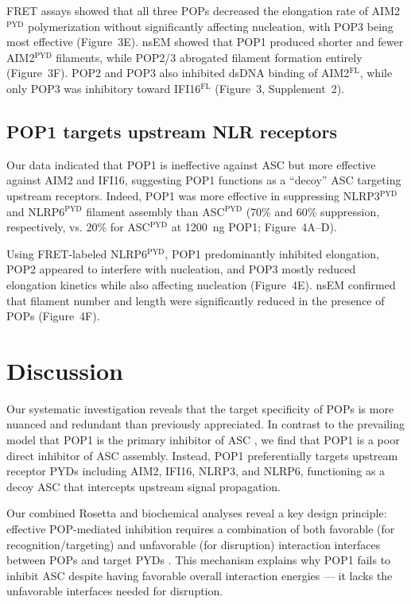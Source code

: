 \documentclass[11pt]{article}
\begin{document}
FRET assays showed that all three POPs decreased the elongation rate of AIM2$^{\text{PYD}}$ polymerization without significantly affecting nucleation, with POP3 being most effective (Figure~3E). nsEM showed that POP1 produced shorter and fewer AIM2$^{\text{PYD}}$ filaments, while POP2/3 abrogated filament formation entirely (Figure~3F). POP2 and POP3 also inhibited dsDNA binding of AIM2$^{\text{FL}}$, while only POP3 was inhibitory toward IFI16$^{\text{FL}}$ (Figure~3, Supplement~2).

\subsection{POP1 targets upstream NLR receptors}

Our data indicated that POP1 is ineffective against ASC but more effective against AIM2 and IFI16, suggesting POP1 functions as a ``decoy'' ASC targeting upstream receptors. Indeed, POP1 was more effective in suppressing NLRP3$^{\text{PYD}}$ and NLRP6$^{\text{PYD}}$ filament assembly than ASC$^{\text{PYD}}$ (70\% and 60\% suppression, respectively, vs. 20\% for ASC$^{\text{PYD}}$ at 1200~ng POP1; Figure~4A--D).

Using FRET-labeled NLRP6$^{\text{PYD}}$, POP1 predominantly inhibited elongation, POP2 appeared to interfere with nucleation, and POP3 mostly reduced elongation kinetics while also affecting nucleation (Figure~4E). nsEM confirmed that filament number and length were significantly reduced in the presence of POPs (Figure~4F).

\section{Discussion}

Our systematic investigation reveals that the target specificity of POPs is more nuanced and redundant than previously appreciated. In contrast to the prevailing model that POP1 is the primary inhibitor of ASC \citep{dealmeida2015}, we find that POP1 is a poor direct inhibitor of ASC assembly. Instead, POP1 preferentially targets upstream receptor PYDs including AIM2, IFI16, NLRP3, and NLRP6, functioning as a decoy ASC that intercepts upstream signal propagation.

Our combined Rosetta and biochemical analyses reveal a key design principle: effective POP-mediated inhibition requires a combination of both favorable (for recognition/targeting) and unfavorable (for disruption) interaction interfaces between POPs and target PYDs \citep{brandstetter2008}. This mechanism explains why POP1 fails to inhibit ASC despite having favorable overall interaction energies --- it lacks the unfavorable interfaces needed for disruption.
\end{document}

